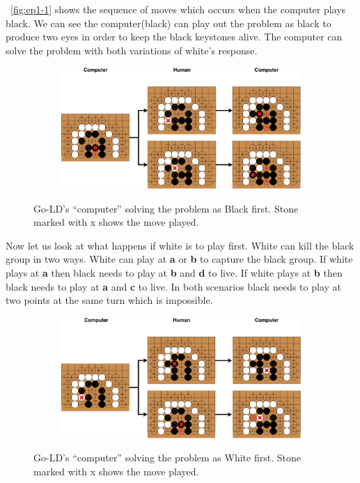 \documentclass{l4proj}
\newcommand{\bo}[1]{\textbf{#1}}
\begin{document}
~\autoref{fig:ep1-1} shows the sequence of moves which occurs when the computer plays black. We can see the computer(black) can play out the problem as black to produce two eyes in order to keep the black keystones alive. The computer can solve the problem with both variations of white’s response.

\begin{figure}[!ht]
\centering
\begin{subfigure}[b]{\textwidth}
\includegraphics[width=\textwidth]{ep1/ep1-1.pdf}
\end{subfigure}
\caption{Go-LD’s “computer” solving the problem as Black first. Stone marked with x shows the move played.}
\label{fig:ep1-1}
\end{figure}

Now let us look at what happens if white is to play first. White can kill the black group in two ways. White can play at \bo{a} or \bo{b} to capture the black group. If white plays at \bo{a} then black needs to play at \bo{b} and \bo{d} to live. If white plays at \bo{b} then black needs to play at \bo{a} and \bo{c} to live. In both scenarios black needs to play at two points at the same turn which is impossible.

\begin{figure}[!ht]
\centering
\begin{subfigure}[b]{\textwidth}
\includegraphics[width=\textwidth]{ep1/ep1-2.pdf}
\end{subfigure}
\caption{ Go-LD’s “computer” solving the problem as White first. Stone marked with x shows the move played.}
\label{fig:ep1-2}
\end{figure}
\end{document}

